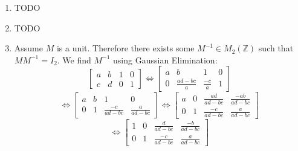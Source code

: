\documentclass{article}
\begin{document}
\begin{enumerate}
\item TODO

\item TODO

\item Assume $M$ is a unit.  Therefore there exists some $M^{-1} \in M_2(\mathbb{Z})$
such that $MM^{-1} = I_2$.  We find $M^{-1}$ using Gaussian Elimination:
\[
\left[
\begin{array}{cc|cc}
a & b & 1 & 0 \\
c & d & 0 & 1
\end{array}
\right]
\Leftrightarrow
\left[
\begin{array}{cc|cc}
a & b & 1 & 0 \\
0 & \frac{ad-bc}{a} & \frac{-c}{a} & 1
\end{array}
\right]
\]
\[
\Leftrightarrow
\left[
\begin{array}{cc|cc}
a & b & 1 & 0 \\
0 & 1 & \frac{-c}{ad-bc} & \frac{a}{ad-bc}
\end{array}
\right]
\Leftrightarrow
\left[
\begin{array}{cc|cc}
a & 0 & \frac{ad}{ad-bc} & \frac{-ab}{ad-bc} \\
0 & 1 & \frac{-c}{ad-bc} & \frac{a}{ad-bc}
\end{array}
\right]
\]
\[
\Leftrightarrow
\left[
\begin{array}{cc|cc}
1 & 0 & \frac{d}{ad-bc} & \frac{-b}{ad-bc} \\
0 & 1 & \frac{-c}{ad-bc} & \frac{a}{ad-bc}
\end{array}
\right]
\]


\end{enumerate}
\end{document}
